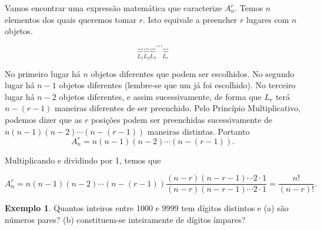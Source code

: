 \documentclass[]{book}
\theoremstyle{definition}
\theoremstyle{definition}
\newtheorem{example}{Exemplo}[chapter]
\theoremstyle{definition}
\theoremstyle{remark}
\begin{document}
Vamos encontrar uma expressão matemática que caracterize \(A^{r}_{n}\).
Temos \(n\) elementos dos quais queremos tomar \(r\).
Isto equivale a preencher \(r\) lugares com \(n\) objetos.

\[
\underbrace{\_\_}_{L_1}\underbrace{\_\_}_{L_2}\underbrace{\_\_}_{L_3}\cdots\underbrace{\_\_}_{L_r}
\]

No primeiro lugar há \(n\) objetos diferentes que podem ser escolhidos.
No segundo lugar há \(n-1\) objetos diferentes (lembre-se que um já foi escolhido).
No terceiro lugar há \(n-2\) objetos diferentes, e assim sucessivamente, de forma que \(L_r\) terá \(n-(r-1)\) maneiras diferentes de ser preenchido.
Pelo Princípio Multiplicativo, podemos dizer que as \(r\) posições podem ser preenchidas sucessivamente de \(n(n-1)(n-2)\cdots(n-(r-1))\) maneiras distintas.
Portanto
\begin{equation}
A^{r}_{n} = n(n-1)(n-2)\cdots(n-(r-1)).
\label{eq:arranjo}
\end{equation}

Multiplicando e dividindo por 1, temos que

\[
A^{r}_{n} = n(n-1)(n-2)\cdots(n-(r-1))\frac{(n-r)(n-r-1)\cdots2\cdot 1}{(n-r)(n-r-1)\cdots2\cdot 1} = \frac{n!}{(n-r)!}.
\]

\begin{example}
\protect\hypertarget{exm:unnamed-chunk-62}{}{\label{exm:unnamed-chunk-62} }Quantos inteiros entre 1000 e 9999 tem dígitos distintos e
(a) são números pares?
(b) constituem-se inteiramente de dígitos ímpares?
\end{example}
\end{document}

